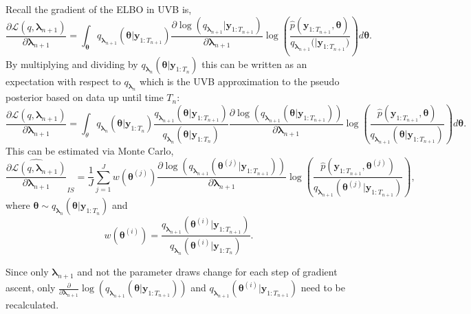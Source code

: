 \documentclass[12pt,a4paper]{article}\usepackage[]{graphicx}\usepackage[]{color}
\begin{document}
{Recall the gradient of the ELBO in UVB is,
\begin{equation}
\label{UVBIS:scoreGrad}
\frac{\partial\mathcal{L}(q, {\bm\lambda}_{n+1})}{\partial {\bm \lambda}_{n+1}} =
 \int_{\bm\theta} q_{{\bm\lambda}_{n+1}}({\bm\theta} | {\bm y}_{1:T_{n+1}}) \frac{\partial \log(q_{{\bm\lambda}_{n+1}} | {\bm y}_{1:T_{n+1}})}{\partial {\bm\lambda}_{n+1}} \log \left(\frac{\hat{p}({\bm y}_{1:T_{n+1}}, {\bm\theta})}{q_{{\bm\lambda}_{n+1}}({ | {\bm y}_{1:T_{n+1}})}} \right) d{\bm\theta}.
\end{equation}
By multiplying and dividing by $q_{{\bm\lambda}_n}({\bm\theta} | {\bm y}_{1:T_n})$ this can be written as an expectation with respect to $q_{{\bm\lambda}_n}$ which is the UVB approximation to the pseudo posterior based on data up until time $T_n$:
\begin{equation}
\label{UVBIS:scoreGradIS}
\frac{\partial\mathcal{L}(q, {\bm \lambda}_{n+1})}{\partial {\bm \lambda}_{n+1}} = \int_{\theta} q_{{\bm \lambda}_{n}}({\bm \theta} | {\bm y}_{1:T_{n}})\frac{q_{{\bm\lambda}_{n+1}}({\bm\theta} | {\bm y}_{1:T_{n+1}})}{q_{{\bm\lambda}_{n}}(\bm{\theta} | {\bm y}_{1:T_{n}})} \frac{\partial \log(q_{{\bm \lambda}_{n+1}}({\bm\theta} | {\bm y}_{1:T_{n+1}}))}{\partial {\bm \lambda}_{n+1}} \log \left(\frac{\hat{p}({\bm y}_{1:T_{n+1}}, {\bm\theta})}{q_{{\bm\lambda}_{n+1}}({\bm\theta} | {\bm y}_{1:T_{n+1}})} \right) d{\bm \theta}.
\end{equation}
This can be estimated via Monte Carlo,
\begin{equation}
\label{UVBIS:scoreEstIS}
\widehat{\frac{\partial\mathcal{L}(q, {\bm \lambda}_{n+1})}{\partial {\bm\lambda}_{n+1}}}_{IS} = \frac{1}{J} \sum_{j=1}^J w({\bm\theta}^{(j)})\frac{\partial \log(q_{{\bm\lambda}_{n+1}}({\bm\theta}^{(j)} | {\bm y}_{1:T_{n+1}}))}{\partial {\bm\lambda}_{n+1}} \log \left(\frac{\hat{p}({\bm y}_{1:T_{n+1}}, {\bm \theta}^{(j)})}{q_{{\bm\lambda}_{n+1}}({\bm\theta}^{(j)} | {\bm y}_{1:T_{n+1}})} \right),
\end{equation}
where ${\bm\theta} \sim q_{{\bm\lambda}_{n}}({\bm\theta} | {\bm y}_{1:{T_n}})$ and 
\begin{equation}
w({\bm\theta}^{(i)}) = \frac{q_{{\bm\lambda}_{n+1}}({\bm\theta}^{(i)} | {\bm y}_{1:T_{n+1}})}{q_{{\bm\lambda}_{n}}({\bm\theta}^{(i)} | {\bm y}_{1:T_{n}})}.
\end{equation}

Since only ${\bm \lambda}_{n+1}$ and not the parameter draws change for each step of gradient ascent, only $\frac{\partial}{\partial {\bm\lambda}_{n+1}} \log(q_{{\bm\lambda}_{n+1}}({\bm\theta} | {\bm y}_{1:T_{n+1}}))$ and $q_{{\bm\lambda}_{n+1}}({\bm\theta}^{(i)} | {\bm y}_{1:T_{n+1}})$ need to be recalculated.
\\

}
\end{document}
